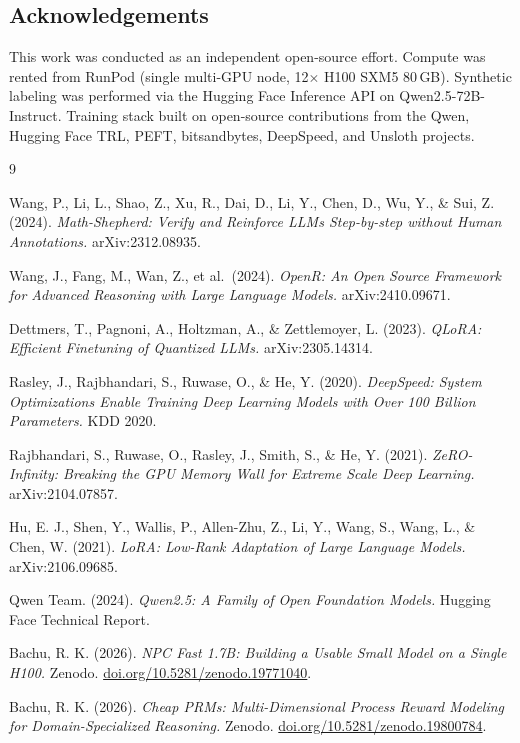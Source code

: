 \documentclass[10pt,letterpaper]{article}
\begin{document}
\subsection*{Acknowledgements}

This work was conducted as an independent open-source effort. Compute was rented from RunPod (single multi-GPU node, 12$\times$ H100 SXM5 80\,GB). Synthetic labeling was performed via the Hugging Face Inference API on Qwen2.5-72B-Instruct. Training stack built on open-source contributions from the Qwen, Hugging Face TRL, PEFT, bitsandbytes, DeepSpeed, and Unsloth projects.

\begin{thebibliography}{9}

Wang, P., Li, L., Shao, Z., Xu, R., Dai, D., Li, Y., Chen, D., Wu, Y., \& Sui, Z. (2024).
\textit{Math-Shepherd: Verify and Reinforce LLMs Step-by-step without Human Annotations.}
arXiv:2312.08935.

Wang, J., Fang, M., Wan, Z., et al.\ (2024).
\textit{OpenR: An Open Source Framework for Advanced Reasoning with Large Language Models.}
arXiv:2410.09671.

Dettmers, T., Pagnoni, A., Holtzman, A., \& Zettlemoyer, L. (2023).
\textit{QLoRA: Efficient Finetuning of Quantized LLMs.}
arXiv:2305.14314.

Rasley, J., Rajbhandari, S., Ruwase, O., \& He, Y. (2020).
\textit{DeepSpeed: System Optimizations Enable Training Deep Learning Models with Over 100 Billion Parameters.}
KDD 2020.

Rajbhandari, S., Ruwase, O., Rasley, J., Smith, S., \& He, Y. (2021).
\textit{ZeRO-Infinity: Breaking the GPU Memory Wall for Extreme Scale Deep Learning.}
arXiv:2104.07857.

Hu, E. J., Shen, Y., Wallis, P., Allen-Zhu, Z., Li, Y., Wang, S., Wang, L., \& Chen, W. (2021).
\textit{LoRA: Low-Rank Adaptation of Large Language Models.}
arXiv:2106.09685.

Qwen Team. (2024).
\textit{Qwen2.5: A Family of Open Foundation Models.}
Hugging Face Technical Report.

Bachu, R. K. (2026).
\textit{NPC Fast 1.7B: Building a Usable Small Model on a Single H100.}
Zenodo. \href{https://doi.org/10.5281/zenodo.19771040}{doi.org/10.5281/zenodo.19771040}.

Bachu, R. K. (2026).
\textit{Cheap PRMs: Multi-Dimensional Process Reward Modeling for Domain-Specialized Reasoning.}
Zenodo. \href{https://doi.org/10.5281/zenodo.19800784}{doi.org/10.5281/zenodo.19800784}.

\end{thebibliography}
\end{document}
